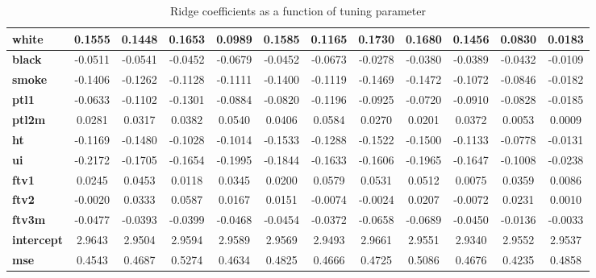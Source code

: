 \documentclass[a4paper,12pt]{article}
\begin{document}
\begin{table}[H]
{\begin{tabular}{|l|c|c|c|c|c|c|c|c|c|c|c|}
\textbf{white}       & 0.1555         & 0.1448        & 0.1653        & 0.0989        & 0.1585        & 0.1165        & 0.1730        & 0.1680        & 0.1456         & 0.0830          & 0.0183            \\ \hline
\textbf{black}       & -0.0511        & -0.0541       & -0.0452       & -0.0679       & -0.0452       & -0.0673       & -0.0278       & -0.0380       & -0.0389        & -0.0432         & -0.0109           \\ \hline
\textbf{smoke}       & -0.1406        & -0.1262       & -0.1128       & -0.1111       & -0.1400       & -0.1119       & -0.1469       & -0.1472       & -0.1072        & -0.0846         & -0.0182           \\ \hline
\textbf{ptl1}        & -0.0633        & -0.1102       & -0.1301       & -0.0884       & -0.0820       & -0.1196       & -0.0925       & -0.0720       & -0.0910        & -0.0828         & -0.0185           \\ \hline
\textbf{ptl2m}       & 0.0281         & 0.0317        & 0.0382        & 0.0540        & 0.0406        & 0.0584        & 0.0270        & 0.0201        & 0.0372         & 0.0053          & 0.0009            \\ \hline
\textbf{ht}          & -0.1169        & -0.1480       & -0.1028       & -0.1014       & -0.1533       & -0.1288       & -0.1522       & -0.1500       & -0.1133        & -0.0778         & -0.0131           \\ \hline
\textbf{ui}          & -0.2172        & -0.1705       & -0.1654       & -0.1995       & -0.1844       & -0.1633       & -0.1606       & -0.1965       & -0.1647        & -0.1008         & -0.0238           \\ \hline
\textbf{ftv1}        & 0.0245         & 0.0453        & 0.0118        & 0.0345        & 0.0200        & 0.0579        & 0.0531        & 0.0512        & 0.0075         & 0.0359          & 0.0086            \\ \hline
\textbf{ftv2}        & -0.0020        & 0.0333        & 0.0587        & 0.0167        & 0.0151        & -0.0074       & -0.0024       & 0.0207        & -0.0072        & 0.0231          & 0.0010            \\ \hline
\textbf{ftv3m}       & -0.0477        & -0.0393       & -0.0399       & -0.0468       & -0.0454       & -0.0372       & -0.0658       & -0.0689       & -0.0450        & -0.0136         & -0.0033           \\ \hline
\textbf{intercept}   & 2.9643         & 2.9504        & 2.9594        & 2.9589        & 2.9569        & 2.9493        & 2.9661        & 2.9551        & 2.9340         & 2.9552          & 2.9537            \\ \hline
\textbf{mse}         & 0.4543         & 0.4687        & 0.5274        & 0.4634        & 0.4825        & 0.4666        & 0.4725        & 0.5086        & 0.4676         & 0.4235          & 0.4858            \\ \hline
\end{tabular}
}
\caption{Ridge coefficients as a function of tuning parameter}
\end{table}
\end{document}

